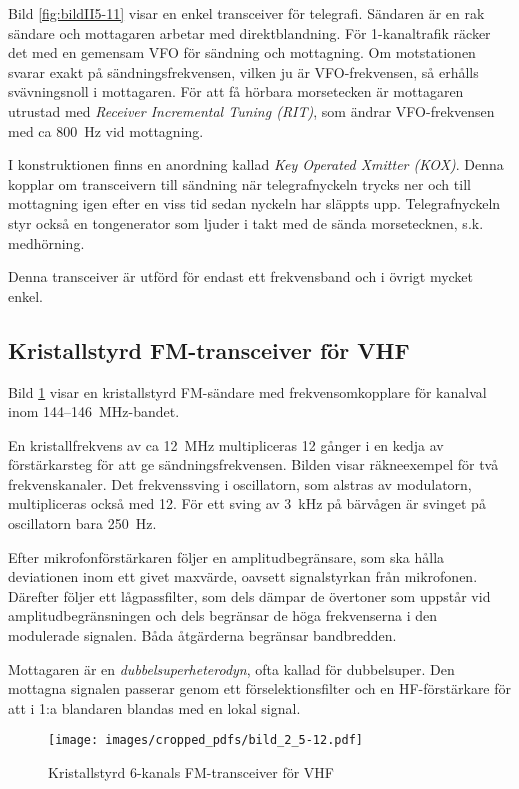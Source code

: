 Bild \ref{fig:bildII5-11} visar en enkel transceiver för telegrafi.
Sändaren är en rak sändare och mottagaren arbetar med direktblandning.
För 1-kanaltrafik räcker det med en gemensam VFO för sändning och mottagning.
Om motstationen svarar exakt på sändningsfrekvensen, vilken ju är
VFO-frekvensen, så erhålls svävningsnoll i mottagaren.
För att få hörbara morsetecken är mottagaren utrustad med
\emph{Receiver Incremental Tuning (RIT)}, som ändrar VFO-frekvensen med
ca 800~Hz vid mottagning.

I konstruktionen finns en anordning kallad \emph{Key Operated Xmitter (KOX)}.
Denna kopplar om transceivern till sändning när telegrafnyckeln trycks ner och
till mottagning igen efter en viss tid sedan nyckeln har släppts upp.
Telegrafnyckeln styr också en tongenerator som ljuder i takt med de sända
morsetecknen, s.k. medhörning.

Denna transceiver är utförd för endast ett frekvensband och i övrigt
mycket enkel.

\subsection{Kristallstyrd FM-transceiver för VHF}

Bild \ref{fig:bildII5-12} visar en kristallstyrd FM-sändare med
frekvensomkopplare för kanalval inom 144--146~MHz-bandet.

En kristallfrekvens av ca 12~MHz multipliceras 12 gånger i en kedja
av förstärkarsteg för att ge sändningsfrekvensen.
Bilden visar räkneexempel för två frekvenskanaler.
Det frekvenssving i oscillatorn, som alstras av modulatorn,
multipliceras också med 12.
För ett sving av 3~kHz på bärvågen är svinget på oscillatorn bara 250~Hz.

Efter mikrofonförstärkaren följer en amplitudbegränsare, som ska
hålla deviationen inom ett givet maxvärde, oavsett signalstyrkan från
mikrofonen.
Därefter följer ett lågpassfilter, som dels dämpar de övertoner som
uppstår vid amplitudbegränsningen och dels begränsar de höga frekvenserna
i den modulerade signalen.
Båda åtgärderna begränsar bandbredden.

Mottagaren är en \emph{dubbelsuperheterodyn}, ofta kallad för dubbelsuper.
Den mottagna signalen passerar genom ett förselektionsfilter och en
HF-förstärkare för att i 1:a blandaren blandas med en lokal signal.

\begin{figure}
  \texttt{[image: images/cropped\_pdfs/bild\_2\_5-12.pdf]}
  \caption{Kristallstyrd 6-kanals FM-transceiver för VHF}
  \label{fig:bildII5-12}
\end{figure}

